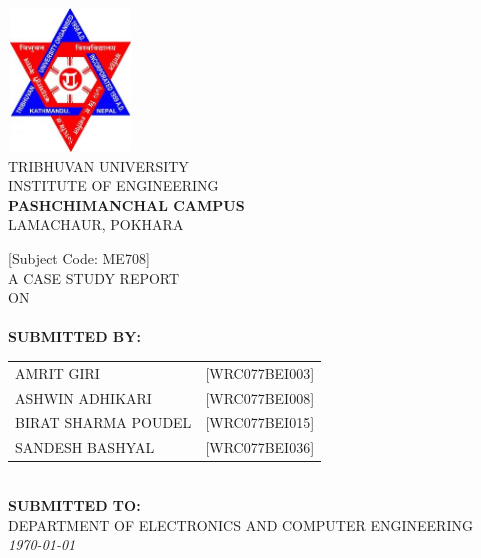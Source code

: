 \begin{titlingpage} 
    \begin{normalsize}
    \begin{center}
    \includegraphics[width=1.3in, height=1.5in]{./Graphics/logotu.jpg}\\
    \vspace{0.5cm}
    \MakeUppercase{TRIBHUVAN UNIVERSITY}\\
    \MakeUppercase{INSTITUTE OF ENGINEERING}\\
    {\fontsize{16pt}{18pt}\selectfont
    \textbf{\MakeUppercase PASHCHIMANCHAL CAMPUS}}\\
    \MakeUppercase{Lamachaur, Pokhara}
    \end{center}
    \vspace{0.5cm}
    
    \begin{center}
    [Subject Code: ME708]\\ A CASE STUDY REPORT\\ON\\
    \textbf{\MakeUppercase \thetitle} \\
    \vspace{1.5 cm}
    \textbf{SUBMITTED BY:}\\
\begin{tabular}{p{5cm} l}
    \MakeUppercase{Amrit Giri} & \MakeUppercase{[WRC077BEI003]}\\
    \MakeUppercase{Ashwin Adhikari} & \MakeUppercase{[WRC077BEI008]}\\
    \MakeUppercase{Birat Sharma Poudel} & \MakeUppercase{[WRC077BEI015]}\\
    \MakeUppercase{Sandesh Bashyal} & \MakeUppercase{[WRC077BEI036]}
\end{tabular}\\
    \vspace{2 cm}
    \textbf{SUBMITTED TO:}\\
    \MakeUppercase{DEPARTMENT OF ELECTRONICS AND COMPUTER ENGINEERING}\\
    \vspace{1.5cm}
    \textit{{\monthyeardate\today}}
    \end{center}
    \end{normalsize}
    \end{titlingpage}
    \newpage
